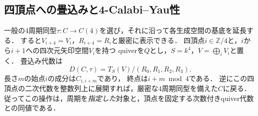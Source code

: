 \subsection{四頂点への畳込みと4-Calabi--Yau性}

一般の4周期同型$\tau:C\to C(4)$を選び，それに沿って各生成空間の基底を延長する．
すると$V_{i+4}=V_i$，$R_{i+4}=R_i$と厳密に表示できる．
四頂点$i\in\mathbb Z/4$と，$i$から$i+1$への四次元矢印空間$V_i$を持つ
quiverを$Q$とし，$S=k^4$，$V=\bigoplus_iV_i$と置く．
畳込み代数は
\begin{equation}\label{eq:p3-rolled-algebra}
 D(C,\tau)=T_S(V)/(R_0,R_1,R_2,R_3).
\end{equation}
長さ$m$の始点$i$の成分は$C_{i,i+m}$であり，
終点は$i+m\bmod4$である．
逆にこの四頂点の二次代数を整数列上に展開すれば，厳密な4周期同型を備えた$C$に戻る．
従ってこの操作は，周期を\emph{指定した}対象と，頂点を固定する次数付きquiver代数との同値である．

